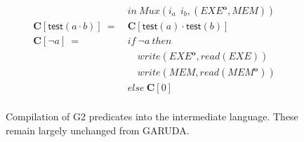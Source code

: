 \documentclass[sigconf,usenames,dvipsnames,svgnames,table]{acmart}
\newcommand{\obf}[1]{#1^\mathbf{o}}
\def \sysname {\textsc{G2}\xspace}
\def \oldname {\textsc{GARUDA}\xspace}
\begin{document}
\begin{figure}
\begin{align*}
              &in\ Mux(i_a\ \ i_b, (\obf{EXE},MEM))\\
            \mathbf{C}[\mathsf{test}(a \cdot b)]\ 
              =\ &\mathbf{C}[\mathsf{test}(a) \cdot \mathsf{test}(b)] \\
            \mathbf{C}[\neg a]\ 
              =\ 
              &if\ \neg a\ then\\
              &\quad write(\obf{EXE}, read(EXE))\\
              &\quad write(MEM, read(\obf{MEM}))\\
              &else\ \mathbf{C}[0]\\
          \end{align*}
          \caption{
            Compilation of \sysname predicates into the intermediate language.
            These remain largely unchanged from \oldname.
          }
          \label{fig:comp:comp:pred}
        \end{figure}

\end{document}

